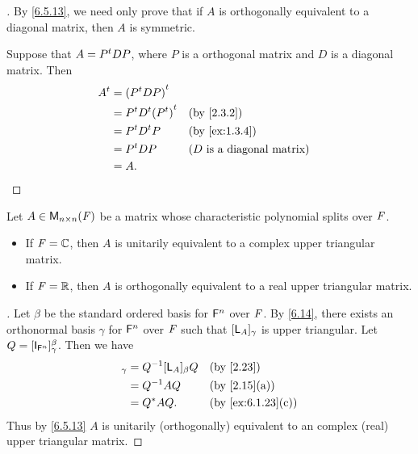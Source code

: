 \begin{proof}[]
  By \cref{6.5.13}, we need only prove that if \(A\) is orthogonally equivalent to a diagonal matrix, then \(A\) is symmetric.

  Suppose that \(A = {P}^{t} D P\), where \(P\) is a orthogonal matrix and \(D\) is a diagonal matrix.
  Then
  \begin{align*}
    \tp{A} & = \tp{(\tp{P} D P)}                                                    \\
           & = \tp{P} \tp{D} \tp{(\tp{P})} &  & \by{2.3.2}                          \\
           & = \tp{P} \tp{D} P             &  & \by{ex:1.3.4}                       \\
           & = \tp{P} D P                  &  & \text{(\(D\) is a diagonal matrix)} \\
           & = A.
  \end{align*}
\end{proof}

\begin{thm}\label{6.21}
  Let \(A \in \ms[n][n][\F]\) be a matrix whose characteristic polynomial splits over \(\mathit{F}\).
  \begin{itemize}
    \item If \(\mathit{F} = \mathbb{C}\), then \(A\) is unitarily equivalent to a complex upper triangular matrix.
    \item If \(\mathit{F} = \mathbb{R}\), then \(A\) is orthogonally equivalent to a real upper triangular matrix.
  \end{itemize}
\end{thm}

\begin{proof}[]
  Let \(\beta\) be the standard ordered basis for \(\mathsf{F}^n\) over \(\mathit{F}\).
  By \cref{6.14}, there exists an orthonormal basis \(\gamma\) for \(\mathsf{F}^n\) over \(\mathit{F}\) such that \([\mathsf{L}_A]_{\gamma}\) is upper triangular.
  Let \(Q = [\IT[\vs{F}^n]]_{\gamma}^{\beta}\).
  Then we have
  \begin{align*}
    [\L_A]_{\gamma} & = Q^{-1} [\L_A]_{\beta} Q &  & \by{2.23}         \\
                    & = Q^{-1} A Q              &  & \by{2.15}[a]      \\
                    & = Q^* A Q.                &  & \by{ex:6.1.23}[c]
  \end{align*}
  Thus by \cref{6.5.13} \(A\) is unitarily (orthogonally) equivalent to an complex (real) upper triangular matrix.
\end{proof}

